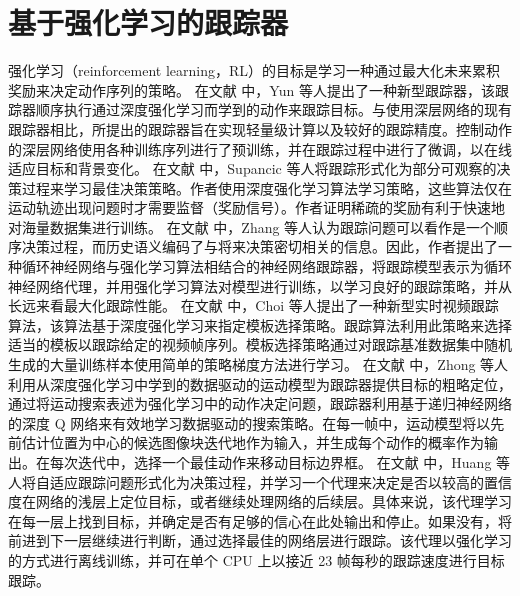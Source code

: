 \section{基于强化学习的跟踪器}
强化学习（reinforcement learning，RL）的目标是学习一种通过最大化未来累积奖励来决定动作序列的策略。
在文献 \cite{yun2017action} 中，Yun 等人提出了一种新型跟踪器，该跟踪器顺序执行通过深度强化学习而学到的动作来跟踪目标。与使用深层网络的现有跟踪器相比，所提出的跟踪器旨在实现轻量级计算以及较好的跟踪精度。控制动作的深层网络使用各种训练序列进行了预训练，并在跟踪过程中进行了微调，以在线适应目标和背景变化。 %
在文献 \cite{supancic2017tracking} 中，Supancic 等人将跟踪形式化为部分可观察的决策过程来学习最佳决策策略。作者使用深度强化学习算法学习策略，这些算法仅在运动轨迹出现问题时才需要监督（奖励信号）。作者证明稀疏的奖励有利于快速地对海量数据集进行训练。 %
在文献 \cite{DeepReinforcement} 中，Zhang 等人认为跟踪问题可以看作是一个顺序决策过程，而历史语义编码了与将来决策密切相关的信息。因此，作者提出了一种循环神经网络与强化学习算法相结合的神经网络跟踪器，将跟踪模型表示为循环神经网络代理，并用强化学习算法对模型进行训练，以学习良好的跟踪策略，并从长远来看最大化跟踪性能。%
在文献 \cite{RealTimeVisual} 中，Choi 等人提出了一种新型实时视频跟踪算法，该算法基于深度强化学习来指定模板选择策略。跟踪算法利用此策略来选择适当的模板以跟踪给定的视频帧序列。模板选择策略通过对跟踪基准数据集中随机生成的大量训练样本使用简单的策略梯度方法进行学习。%
在文献 \cite{HierarchicalTracking} 中，Zhong 等人利用从深度强化学习中学到的数据驱动的运动模型为跟踪器提供目标的粗略定位，通过将运动搜索表述为强化学习中的动作决定问题，跟踪器利用基于递归神经网络的深度 Q 网络来有效地学习数据驱动的搜索策略。在每一帧中，运动模型将以先前估计位置为中心的候选图像块迭代地作为输入，并生成每个动作的概率作为输出。在每次迭代中，选择一个最佳动作来移动目标边界框。%
在文献 \cite{LearningPolicies} 中，Huang 等人将自适应跟踪问题形式化为决策过程，并学习一个代理来决定是否以较高的置信度在网络的浅层上定位目标，或者继续处理网络的后续层。具体来说，该代理学习在每一层上找到目标，并确定是否有足够的信心在此处输出和停止。如果没有，将前进到下一层继续进行判断，通过选择最佳的网络层进行跟踪。该代理以强化学习的方式进行离线训练，并可在单个 CPU 上以接近 23 帧每秒的跟踪速度进行目标跟踪。%
